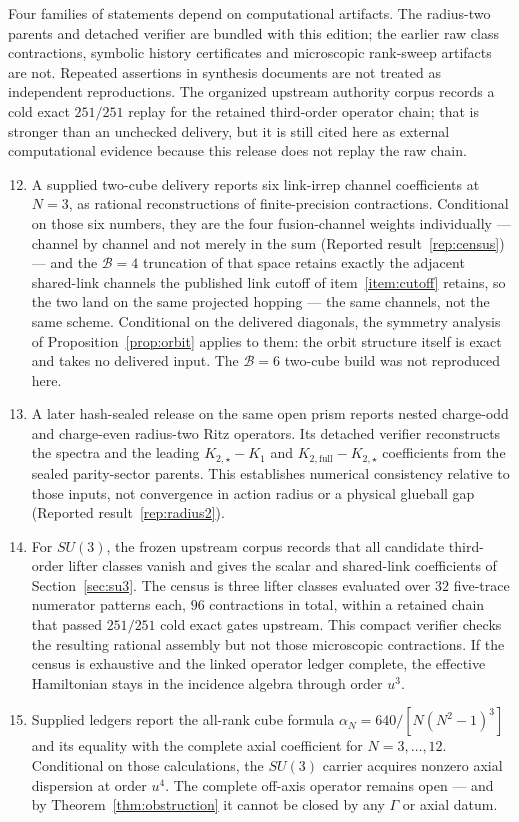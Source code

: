 \documentclass[11pt]{article}
\theoremstyle{plain}
\theoremstyle{definition}
\theoremstyle{remark}
\begin{document}
Four families of statements depend on computational artifacts. The radius-two
parents and detached verifier are bundled with this edition; the earlier raw
class contractions, symbolic history certificates and microscopic rank-sweep
artifacts are not. Repeated assertions in synthesis documents are not treated
as independent reproductions. The organized upstream authority corpus records a cold exact
$251/251$ replay for the retained third-order operator chain; that is stronger
than an unchecked delivery, but it is still cited here as external
computational evidence because this release does not replay the raw chain.

\begin{enumerate}\setcounter{enumi}{11}\itemsep2pt
\item A supplied two-cube delivery reports six link-irrep channel
  coefficients at $N=3$, as rational reconstructions of finite-precision
  contractions. Conditional on those six numbers, they are the four
  fusion-channel weights individually --- channel by channel and not merely in
  the sum (Reported result~\ref{rep:census}) --- and the $\mathcal B=4$ truncation of
  that space retains exactly the adjacent shared-link channels the published
  link cutoff of item~\ref{item:cutoff} retains, so the two land on the same
  projected hopping --- the same channels, not the same scheme. Conditional on the delivered diagonals, the symmetry
  analysis of Proposition~\ref{prop:orbit} applies to them: the orbit structure
  itself is exact and takes no delivered input.
  The $\mathcal B=6$ two-cube build was not reproduced here.
\item A later hash-sealed release on the same open prism reports nested
  charge-odd and charge-even radius-two Ritz operators. Its detached verifier
  reconstructs the spectra and the leading $K_{2,\star}-K_1$ and
  $K_{2,\mathrm{full}}-K_{2,\star}$ coefficients from the sealed parity-sector
  parents. This establishes numerical consistency relative to those inputs,
  not convergence in action radius or a physical glueball gap
  (Reported result~\ref{rep:radius2}).
\item\label{item:domino} For $SU(3)$, the frozen upstream corpus records that
  all candidate third-order lifter classes vanish and gives the scalar and
  shared-link coefficients of Section~\ref{sec:su3}. The census is three
  lifter classes evaluated over $32$ five-trace numerator patterns each, $96$
  contractions in total, within a retained chain that passed $251/251$ cold
  exact gates upstream. This compact verifier checks the resulting rational
  assembly but not those microscopic contractions. If the census is exhaustive
  and the linked operator ledger complete, the effective Hamiltonian stays in
  the incidence algebra through order $u^3$.
\item Supplied ledgers report the all-rank cube formula
  $\alpha_N=640/[N(N^2-1)^3]$ and its equality with the complete axial
  coefficient for $N=3,\dots,12$. Conditional on those calculations, the
  $SU(3)$ carrier acquires nonzero axial dispersion at order $u^4$. The
  complete off-axis operator remains open --- and by
  Theorem~\ref{thm:obstruction} it cannot be closed by any $\Gamma$ or axial
  datum.
\end{enumerate}
\end{document}
